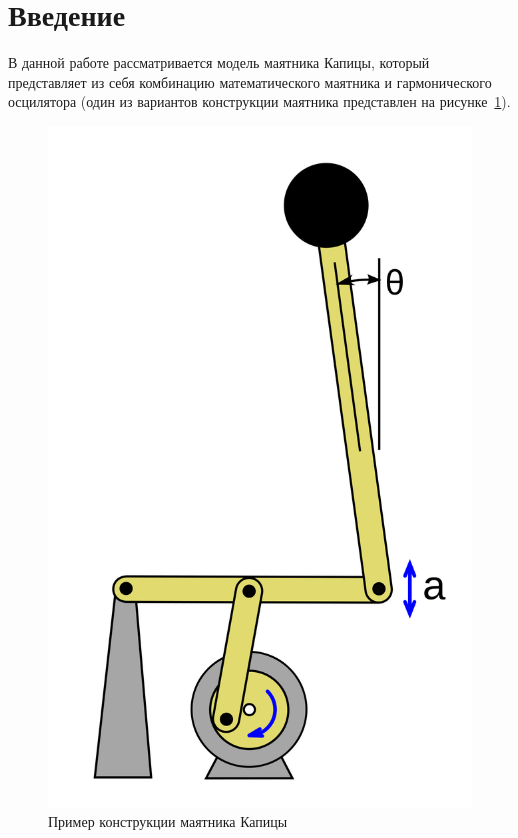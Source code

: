 \documentclass[a4paper,12pt]{article}
\begin{document}
	\newpage
	\section{Введение}
	
	В данной работе рассматривается модель маятника Капицы, который
	представляет из себя комбинацию математического маятника и гармонического
	осцилятора (один из вариантов конструкции маятника представлен на 
	рисунке~\ref{fig:pend}).

	\begin{figure}[ht!]
		  \begin{center}
		  \includegraphics[scale=0.2]{sources/pend.png}
		  \end{center}
		  \vspace*{-8mm}
		  \caption{Пример конструкции маятника Капицы}\label{fig:pend}
	\end{figure}
	
\end{document}
